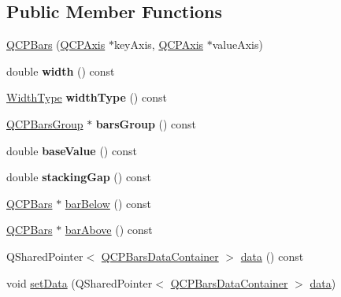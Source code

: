 \subsection*{Public Member Functions}
\begin{DoxyCompactItemize}
\item 
\mbox{\hyperlink{class_q_c_p_bars_a64006999ad9dff308f40df41cef176ad}{Q\+C\+P\+Bars}} (\mbox{\hyperlink{class_q_c_p_axis}{Q\+C\+P\+Axis}} $\ast$key\+Axis, \mbox{\hyperlink{class_q_c_p_axis}{Q\+C\+P\+Axis}} $\ast$value\+Axis)
\item 
\mbox{\label{class_q_c_p_bars_abe7eb3987d8711f45829db879aee2280}} 
double {\bfseries width} () const
\item 
\mbox{\label{class_q_c_p_bars_a4c103fb405a45f47853e0345f0c6e708}} 
\mbox{\hyperlink{class_q_c_p_bars_a65dbbf1ab41cbe993d71521096ed4649}{Width\+Type}} {\bfseries width\+Type} () const
\item 
\mbox{\label{class_q_c_p_bars_a5eef59840b68d205df4e0c3df5f97633}} 
\mbox{\hyperlink{class_q_c_p_bars_group}{Q\+C\+P\+Bars\+Group}} $\ast$ {\bfseries bars\+Group} () const
\item 
\mbox{\label{class_q_c_p_bars_a29a7b3b86f80b2a04bd1f9ec0ebaf422}} 
double {\bfseries base\+Value} () const
\item 
\mbox{\label{class_q_c_p_bars_a2e6192fa9c16df7ba94cd50c0c9ec7ce}} 
double {\bfseries stacking\+Gap} () const
\item 
\mbox{\hyperlink{class_q_c_p_bars}{Q\+C\+P\+Bars}} $\ast$ \mbox{\hyperlink{class_q_c_p_bars_a1b58664864b141f45e02044a855b3213}{bar\+Below}} () const
\item 
\mbox{\hyperlink{class_q_c_p_bars}{Q\+C\+P\+Bars}} $\ast$ \mbox{\hyperlink{class_q_c_p_bars_ab97f2acd9f6cb40d2cc3c33d278f0e78}{bar\+Above}} () const
\item 
Q\+Shared\+Pointer$<$ \mbox{\hyperlink{class_q_c_p_data_container}{Q\+C\+P\+Bars\+Data\+Container}} $>$ \mbox{\hyperlink{class_q_c_p_bars_a7e373a534d82e18ed27b3fafd1f08fae}{data}} () const
\item 
void \mbox{\hyperlink{class_q_c_p_bars_a6dc562ec7120a8521e1061f2134367e4}{set\+Data}} (Q\+Shared\+Pointer$<$ \mbox{\hyperlink{class_q_c_p_data_container}{Q\+C\+P\+Bars\+Data\+Container}} $>$ \mbox{\hyperlink{class_q_c_p_bars_a7e373a534d82e18ed27b3fafd1f08fae}{data}})

\end{DoxyCompactItemize}
